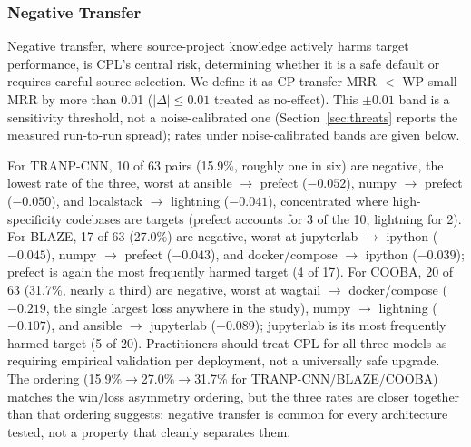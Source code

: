 \documentclass[a4paper,fleqn]{cas-dc}
\begin{document}
\subsubsection{Negative Transfer}

Negative transfer, where source-project knowledge actively harms target
performance, is CPL's central risk, determining whether it is a safe
default or requires careful source selection. We define it as CP-transfer
MRR $<$ WP-small MRR by more than 0.01 ($|\Delta| \leq 0.01$ treated as
no-effect). This $\pm 0.01$ band is a sensitivity threshold, not a
noise-calibrated one (Section~\ref{sec:threats} reports the measured
run-to-run spread); rates under noise-calibrated bands are given below.

For TRANP-CNN, 10 of 63 pairs (15.9\%, roughly one in six) are negative, the
lowest rate of the three, worst at ansible $\to$ prefect ($-0.052$), numpy
$\to$ prefect ($-0.050$), and localstack $\to$ lightning ($-0.041$),
concentrated where high-specificity codebases are targets (prefect accounts
for 3 of the 10, lightning for 2). For BLAZE, 17 of 63 (27.0\%) are negative,
worst at jupyterlab $\to$ ipython ($-0.045$), numpy $\to$ prefect ($-0.043$),
and docker/compose $\to$ ipython ($-0.039$); prefect is again the most
frequently harmed target (4 of 17). For COOBA, 20 of 63 (31.7\%,
nearly a third) are negative, worst at wagtail $\to$ docker/compose
($-0.219$, the single largest loss anywhere in the study), numpy $\to$
lightning ($-0.107$), and ansible $\to$ jupyterlab ($-0.089$); jupyterlab is
its most frequently harmed target (5 of 20). Practitioners should treat
CPL for all three models as requiring empirical validation per deployment, not a
universally safe upgrade. The ordering
(15.9\%$\to$27.0\%$\to$31.7\% for TRANP-CNN/BLAZE/COOBA) matches the win/loss
asymmetry ordering, but the three rates are closer together than that
ordering suggests: negative transfer is common for every architecture tested,
not a property that cleanly separates them.
\end{document}
